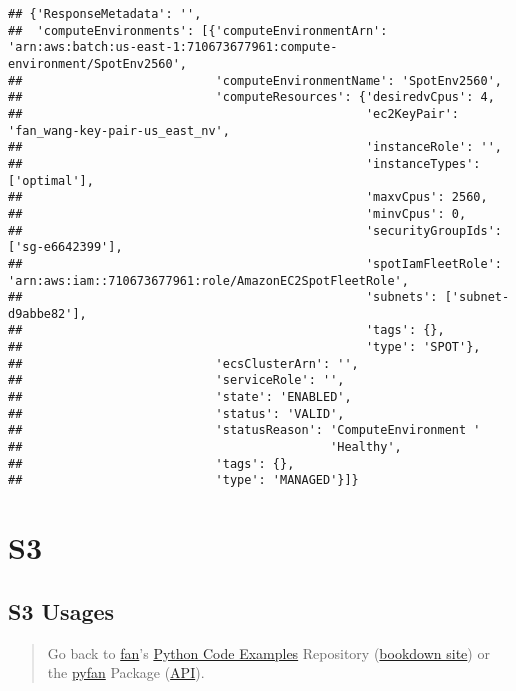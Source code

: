 \documentclass[
]{book}
\begin{document}
\begin{verbatim}
## {'ResponseMetadata': '',
##  'computeEnvironments': [{'computeEnvironmentArn': 'arn:aws:batch:us-east-1:710673677961:compute-environment/SpotEnv2560',
##                           'computeEnvironmentName': 'SpotEnv2560',
##                           'computeResources': {'desiredvCpus': 4,
##                                                'ec2KeyPair': 'fan_wang-key-pair-us_east_nv',
##                                                'instanceRole': '',
##                                                'instanceTypes': ['optimal'],
##                                                'maxvCpus': 2560,
##                                                'minvCpus': 0,
##                                                'securityGroupIds': ['sg-e6642399'],
##                                                'spotIamFleetRole': 'arn:aws:iam::710673677961:role/AmazonEC2SpotFleetRole',
##                                                'subnets': ['subnet-d9abbe82'],
##                                                'tags': {},
##                                                'type': 'SPOT'},
##                           'ecsClusterArn': '',
##                           'serviceRole': '',
##                           'state': 'ENABLED',
##                           'status': 'VALID',
##                           'statusReason': 'ComputeEnvironment '
##                                           'Healthy',
##                           'tags': {},
##                           'type': 'MANAGED'}]}
\end{verbatim}

\hypertarget{s3}{%
\section{S3}\label{s3}}

\hypertarget{s3-usages}{%
\subsection{S3 Usages}\label{s3-usages}}

\begin{quote}
Go back to \href{http://fanwangecon.github.io/}{fan}'s \href{https://fanwangecon.github.io/Py4Econ/}{Python Code Examples} Repository (\href{https://fanwangecon.github.io/Py4Econ/bookdown}{bookdown site}) or the \href{https://pyfan.readthedocs.io/en/latest/}{pyfan} Package (\href{https://pyfan.readthedocs.io/en/latest/reference.html}{API}).
\end{quote}
\end{document}
